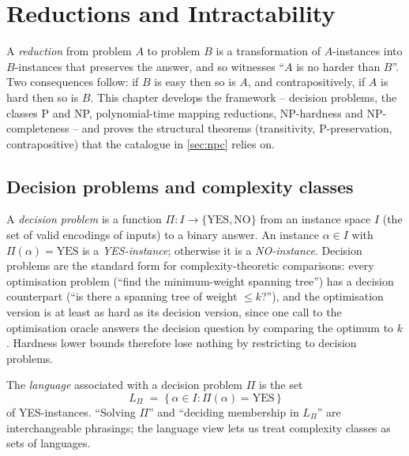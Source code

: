 \section{Reductions and Intractability}
\label{sec:reductions}

A \emph{reduction} from problem $A$ to problem $B$ is a transformation of $A$-instances into $B$-instances that preserves the answer, and so witnesses ``$A$ is no harder than $B$''. Two consequences follow: if $B$ is easy then so is $A$, and contrapositively, if $A$ is hard then so is $B$. This chapter develops the framework -- decision problems, the classes P and NP, polynomial-time mapping reductions, NP-hardness and NP-completeness -- and proves the structural theorems (transitivity, P-preservation, contrapositive) that the catalogue in \cref{sec:npc} relies on.

\subsection{Decision problems and complexity classes}

\begin{definition}
\label{def:decision_problem}
A \emph{decision problem} is a function $\Pi : I \to \{\text{YES}, \text{NO}\}$ from an instance space $I$ (the set of valid encodings of inputs) to a binary answer. An instance $\alpha \in I$ with $\Pi(\alpha) = \text{YES}$ is a \emph{YES-instance}; otherwise it is a \emph{NO-instance}. Decision problems are the standard form for complexity-theoretic comparisons: every optimisation problem (``find the minimum-weight spanning tree'') has a decision counterpart (``is there a spanning tree of weight $\le k$?''), and the optimisation version is at least as hard as its decision version, since one call to the optimisation oracle answers the decision question by comparing the optimum to $k$. Hardness lower bounds therefore lose nothing by restricting to decision problems.
\end{definition}

\begin{definition}[Language]
\label{def:language}
The \emph{language} associated with a decision problem $\Pi$ is the set
\[
  L_\Pi \;=\; \{\, \alpha \in I : \Pi(\alpha) = \text{YES}\,\}
\]
of YES-instances. ``Solving $\Pi$'' and ``deciding membership in $L_\Pi$'' are interchangeable phrasings; the language view lets us treat complexity classes as sets of languages.
\end{definition}

